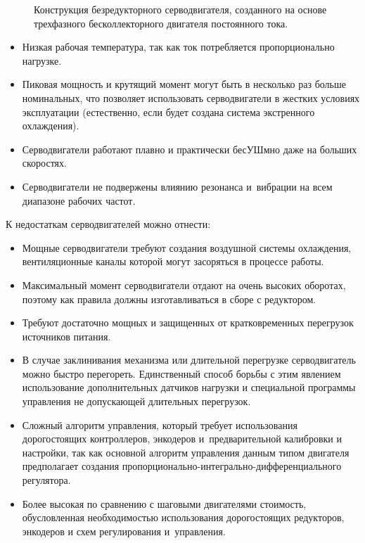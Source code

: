 \begin{figure}[ht]
	\caption{Конструкция безредукторного серводвигателя, созданного на основе трехфазного бесколлекторного двигателя постоянного тока.}\label{fig:servo}
\end{figure}

\begin{itemize}
	\item Низкая рабочая температура, так как ток потребляется пропорционально нагрузке.
	\item Пиковая мощность и крутящий момент могут быть в несколько раз больше номинальных, что позволяет использовать серводвигатели в жестких условиях эксплуатации (естественно, если будет создана система экстренного охлаждения).
	\item Серводвигатели работают плавно и практически бесУШмно даже на больших скоростях.
	\item Серводвигатели не подвержены влиянию резонанса и~вибрации на всем диапазоне рабочих частот.
\end{itemize}

К недостаткам серводвигателей можно отнести:

\begin{itemize}
	\item Мощные серводвигатели требуют создания воздушной системы охлаждения, вентиляционные каналы которой могут засоряться в процессе работы.
	\item Максимальный момент серводвигатели отдают на очень высоких оборотах, поэтому как правила должны изготавливаться в сборе с редуктором.
	\item Требуют достаточно мощных и защищенных от кратковременных перегрузок источников питания.
	\item В случае заклинивания механизма или длительной перегрузке серводвигатель можно быстро перегореть. Единственный способ борьбы с этим явлением использование дополнительных датчиков нагрузки и специальной программы управления не допускающей длительных перегрузок.
	\item Сложный алгоритм управления, который требует использования дорогостоящих контроллеров, энкодеров и~предварительной калибровки и настройки, так как основной алгоритм управления данным типом двигателя предполагает создания пропорционально-интегрально-дифференциального регулятора.
	\item Более высокая по сравнению с шаговыми двигателями стоимость, обусловленная необходимостью использования дорогостоящих редукторов, энкодеров и схем регулирования и~управления.
\end{itemize}

